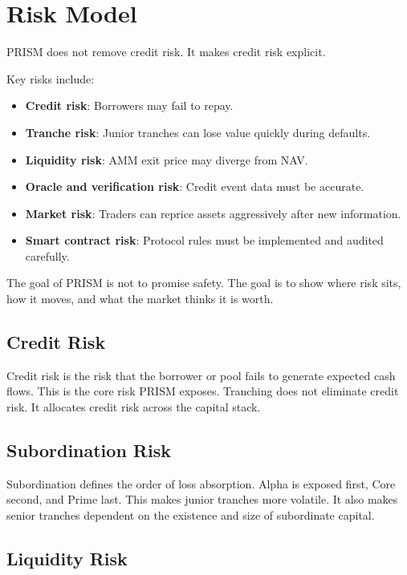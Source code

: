 \documentclass[11pt]{article}
\begin{document}
\section{Risk Model}

PRISM does not remove credit risk. It makes credit risk explicit.

Key risks include:

\begin{itemize}
  \item \textbf{Credit risk}: Borrowers may fail to repay.
  \item \textbf{Tranche risk}: Junior tranches can lose value quickly during
  defaults.
  \item \textbf{Liquidity risk}: AMM exit price may diverge from NAV.
  \item \textbf{Oracle and verification risk}: Credit event data must be
  accurate.
  \item \textbf{Market risk}: Traders can reprice assets aggressively after new
  information.
  \item \textbf{Smart contract risk}: Protocol rules must be implemented and
  audited carefully.
\end{itemize}

The goal of PRISM is not to promise safety. The goal is to show where risk sits,
how it moves, and what the market thinks it is worth.

\subsection{Credit Risk}

Credit risk is the risk that the borrower or pool fails to generate expected
cash flows. This is the core risk PRISM exposes. Tranching does not eliminate
credit risk. It allocates credit risk across the capital stack.

\subsection{Subordination Risk}

Subordination defines the order of loss absorption. Alpha is exposed first, Core
second, and Prime last. This makes junior tranches more volatile. It also makes
senior tranches dependent on the existence and size of subordinate capital.

\subsection{Liquidity Risk}
\end{document}
